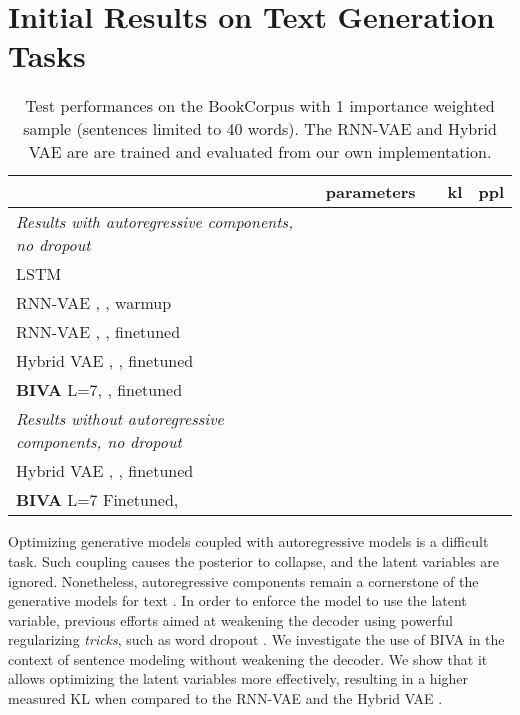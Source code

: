\documentclass{article}
\def\nm{BIVA\xspace}
\begin{document}
\section{Initial Results on Text Generation Tasks}\label{app:text_modeling}

\begin{table}[h!]
\renewcommand\figurename{Table}
\begin{center}
\begin{small}
\begin{sc}
\begin{tabular}{l c c c c}
     & parameters &  & kl & ppl\\
    \hline
    \textit{Results with autoregressive components, no dropout} \\
    LSTM &  &  &  &  \\
    RNN-VAE \cite{Bowman2015}, , warmup &  &  &  &  \\
    RNN-VAE \cite{Bowman2015}, , finetuned &  &  &  & \\
    Hybrid VAE \cite{semeniuta2017hybrid}, , finetuned &  & &  &  \\
\textbf{\nm} L=7, , finetuned &  &  &  & \\
    \hline
     \textit{Results without autoregressive components, no dropout} \\
    Hybrid VAE \cite{semeniuta2017hybrid}, , finetuned &  &  &  & \\
\textbf{\nm} L=7 Finetuned,  &  &  &  & \\
    \hline
    \end{tabular}\end{sc}
\end{small}
\end{center}

\caption{Test performances on the BookCorpus with 1 importance weighted sample (sentences limited to 40 words). The RNN-VAE and Hybrid VAE are are trained and evaluated from our own implementation.}\label{table:bookcorpus-results}
\end{table}

Optimizing generative models coupled with autoregressive models is a difficult task. Such coupling causes the posterior to collapse, and the latent variables are ignored. Nonetheless, autoregressive components remain a cornerstone of the generative models for text \cite{Bowman2015, semeniuta2017hybrid,shah2018generating}. In order to enforce the model to use the latent variable, previous efforts aimed at weakening the decoder using powerful regularizing \textit{tricks}, such as word dropout \citep{Bowman2015}. We investigate the use of \nm in the context of sentence modeling without weakening the decoder. We show that it allows optimizing the latent variables more effectively, resulting in a higher measured KL when compared to the RNN-VAE \citep{Bowman2015} and the Hybrid VAE \citep{semeniuta2017hybrid}.
\end{document}
